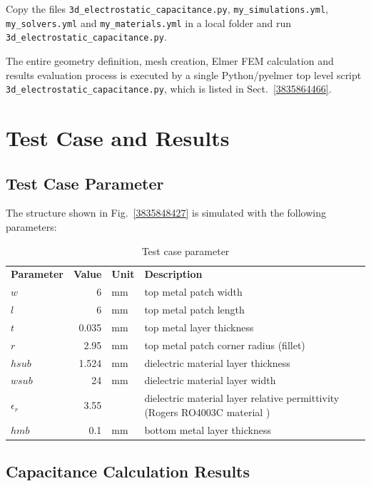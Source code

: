 \documentclass[10pt,a4paper,titlepage]{article}
\newcommand{\fig}[1]{Fig.~\ref{#1}}
\newcommand{\sect}[1]{Sect.~\ref{#1}}
\begin{document}
Copy the files \verb|3d_electrostatic_capacitance.py|, \verb|my_simulations.yml|, \verb|my_solvers.yml| and \verb|my_materials.yml| in a local folder and run \verb|3d_electrostatic_capacitance.py|.

The entire geometry definition, mesh creation, Elmer FEM calculation and results evaluation process is executed by a single Python/pyelmer top level script \verb|3d_electrostatic_capacitance.py|, which is listed in \sect{3835864466}.




\section{Test Case and Results}

\subsection{Test Case Parameter}

The structure shown in \fig{3835848427} is simulated with the following parameters:

\begin{table}[H]
\centering
\begin{tabular}{lrll}
\bf Parameter & \bf Value & \bf Unit  & \bf Description \\
$w$ & 6 & \si{\milli\meter}	& top metal patch width \\
$l$ & 6 & \si{\milli\meter}	& top metal patch length \\
$t$ & 0.035 & \si{\milli\meter}	& top metal layer thickness \\
$r$ & 2.95 & \si{\milli\meter}	& top metal patch corner radius (fillet) \\
$hsub$ & 1.524 & \si{\milli\meter}	& dielectric material layer thickness \\
$wsub$ & 24 & \si{\milli\meter}	& dielectric material layer width\\
$\epsilon_r$ & 3.55 & 	& dielectric material layer relative permittivity (Rogers RO4003C material \cite{RO4003C})\\
$hmb$ & 0.1 & \si{\milli\meter}	& bottom metal layer thickness \\
\end{tabular}
\caption{Test case parameter}
\end{table}

\subsection{Capacitance Calculation Results}
\end{document}
